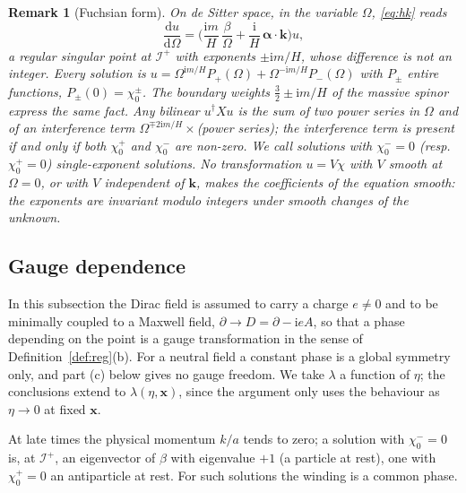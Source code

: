 \documentclass[11pt,a4paper]{article}
\newtheorem{remark}{Remark}
\theoremstyle{definition}
\newcommand{\scri}{\mathscr{I}^{+}}
\newcommand{\dd}{\mathrm{d}}
\newcommand{\ii}{\mathrm{i}}
\begin{document}
\begin{remark}[Fuchsian form]
\label{rem:fuchs}
On de Sitter space, in the variable $\Omega$, \eqref{eq:hk} reads
\begin{equation}
\frac{\dd u}{\dd\Omega}=\Big(\frac{\ii m}{H}\,\frac{\beta}{\Omega}+\frac{\ii}{H}\,\boldsymbol\alpha\cdot\mathbf{k}\Big)u ,
\end{equation}
a regular singular point at $\scri$ with exponents $\pm\ii m/H$, whose difference is not an integer. Every solution is $u=\Omega^{\ii m/H}P_{+}(\Omega)+\Omega^{-\ii m/H}P_{-}(\Omega)$ with $P_{\pm}$ entire functions, $P_{\pm}(0)=\chi_{0}^{\pm}$. The boundary weights $\tfrac32\pm\ii m/H$ of the massive spinor express the same fact. Any bilinear $u^{\dagger}Xu$ is the sum of two power series in $\Omega$ and of an interference term $\Omega^{\mp2\ii m/H}\times$(power series); the interference term is present if and only if both $\chi_{0}^{+}$ and $\chi_{0}^{-}$ are non-zero. We call solutions with $\chi_{0}^{-}=0$ (resp.\ $\chi_{0}^{+}=0$) \emph{single-exponent} solutions. No transformation $u=V\chi$ with $V$ smooth at $\Omega=0$, or with $V$ independent of $\mathbf{k}$, makes the coefficients of the equation smooth: the exponents are invariant modulo integers under smooth changes of the unknown.
\end{remark}

\subsection{Gauge dependence}
\label{sec:gauge}

In this subsection the Dirac field is assumed to carry a charge $e\neq0$ and to be minimally coupled to a Maxwell field, $\partial\to D=\partial-\ii eA$, so that a phase depending on the point is a gauge transformation in the sense of Definition~\ref{def:reg}(b). For a neutral field a constant phase is a global symmetry only, and part (c) below gives no gauge freedom. We take $\lambda$ a function of $\eta$; the conclusions extend to $\lambda(\eta,\mathbf{x})$, since the argument only uses the behaviour as $\eta\to0$ at fixed $\mathbf{x}$.

At late times the physical momentum $k/a$ tends to zero; a solution with $\chi_{0}^{-}=0$ is, at $\scri$, an eigenvector of $\beta$ with eigenvalue $+1$ (a particle at rest), one with $\chi_{0}^{+}=0$ an antiparticle at rest. For such solutions the winding is a common phase.
\end{document}
